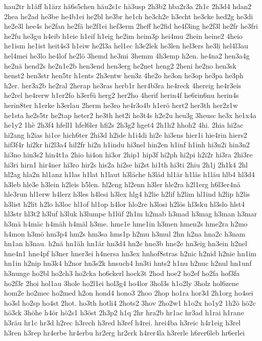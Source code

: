 {hau2tr
h1äff
h1ärz
hä6s5chen
häu2s1c
hä3usp
2h3b2
hba2r3a
2h1c
2h3d4
hdan2
2hea
he2ad
he3be
he4b1ei
he2bl
he3br
he1ch
he3ch2e
h3echt
he3cke
hed2g
he3di
he2e3l
hee4s
he2fan
he2fä
he2f1ei
hef3erm
2heff
he2fid
he4f3ing
he2f3l
he2fr
he3fri
he2fu
he3gu
h4eib
h1eie
h1eif
h1eig
he2im
heim3p
hei4mu
2hein
heine2
4heio
he1ism
he1ist
heit4s3
h1eiw
he2l3a
hel1ec
h3e2lek
he3len
hel3ers
he3li
hel4l3au
hel4mei
he3lo
he4lof
he2lö
3hemd
he3mi
3hemm
4h3emp
h2en.
he4na2
hen3a4g
he2nä
hend2s
he2n1e2b
hen3end
hen3erg
he2net
heng2
2heni
he2no
hen3sk
henst2
hen3str
hen5tr
h1ents
2h3entw
hen3z
4he2o
he3on
he3op
he3pa
he3ph
h2er.
her3a2b
he2ral
2herap
he3ras
herb1r
her4b3ra
he4reck
4hereig
he4r3eis
he2rel
he4rerw
h1er2fo
h3erfü
herg2
her2ho
4herif
herin4f
he6rin6nu
herin4s
herin8ter
h1erke
h3erlau
2herm
he3ro
he4r3o4b
h1erö
hert2
her3th
her2z1w
he1sta
he2s5tr
he2tap
heter2
he3th
het2i
he3t4s
h2e2u
heu3g
3heusc
he3x
he1x4a
he1y2
1hè
2h3f4
hfell1
hfel6ler
hfi2s
2h3g2
hget4
2h1h2
hhoh2
4hi.
2hia
hi2ac
hi2ang
h2ias
hi1ce
hich6ter
2hi3d
h2ide
h1i4di
hi2e
hi3ens
hier1i
hie4rin
hiers2
hif3f4r
hi2kr
hi2l3a4
hil2fr
hi2n
h1indu
hi3nel
hin2en
h1inf
h1inh
hi3n2i
hin3n2
hi3no
hin3s2
hin4t1a
2hio
hi4on
hi3or
2hip1
hip3f
hi2ph
hi2pi
h2i2r
hi3ra
2hi3re
hi3ri
hirn1
hir4ner
hi3ro
hir2s
his2a
hi2se
hi2st
hi1th
hi3ti
2hiu
2h1j
2h1k4
2hl
hl2ag
hla2n
hl1anz
h1las
h1lat
h1laut
h3läche
h3läd
hl1är
h1läs
h1läu
hlb4
hl3d4
h3leb
hle3e
h3lein
h2leis
h5len.
hl2eng
hl2enn
h3ler
hle2ra
h2l1erg
h6l3er4nä
hle3run
hl1erw
h4lerz
h3les
h4lesi
h3lex
hlg4
h2lie
h2lif
h2lim
hl1ind
h2lip
h2lis
h3list
h2lit
h2lo
h3loc
hl1of
hl1op
h4lor
hlo2re
h3losi
h2lös
hl3sku
hl3slo
hlst4
hl3str
hl3t2
h3luf
h3luk
h3lumpe
h1lüf
2h1m
h2mab
h3mad
h3mag
h3man
h3mar
h3mä
h4mäc
h4mäh
h4mäl
h3me.
hme1e
hme1in
h3men
hmen2s
hme2ra
h2mo
h4mon
h3mö
hm3p4
hm2s
hm3sa
hms1p
h2mu
h3mul
2hn
h2na
hna2c
h3nam
hn1an
h3nau.
h2nä
hn1äh
hn1är
hn3d4
hn2e
hne3b
hne2e
hn3eig
hn3ein
h2nel
hne4n1
hne4pf
h3ner
hner3ei
h4nersa
hn3ex
hnhof8stras
h2nic
h2nid
h2nie
hn1im
hn1in
h2nip
hn3k4
h2nor
hn3s2k
hnsuch4
hn3ti
hnts2
h1nu
h2nuc
h2nul
hn1unf
h3nunge
ho2bl
ho2ch3
ho2cka
ho6ckerl
hock3t
2hod
hoe2
ho2ef
ho2fa
hof3fa
ho2f3r
2hoi
hol1au
3hole
ho2l1ei
hol3g4
ho4lor
3hol3s
h1o2ly
3holz
hol6zene
hom2e
ho2mec
ho2med
h2on
hond4
hono3
2hoo
2hop
ho1ra
hor3d
2h1org
ho4sei
ho3sl
ho2sp
ho4st
2hot.
ho3th
hotli4
2hots2
3hov
2ho2w1
h1o2x
ho1y2
1h2ö
hö2c
hö3ck
3höhe
h4ör
hö2s1
h3öst
2h3p2
h1q
2hr
hra2b
hr1ac
hr3ad
h1rai
h1rane
h3räu
hr1c
hr3d
h2rec
h3rech
h3red
h3ref
h4rei.
hrei4ba
h3reic
h4r1eig
h3rel
h3ren
h3rep
hr4erbe
hr4erbu
hr2erg
hr2erk
h4rer4la
h3rerle
h6rer6leb
hr6erlei
}
